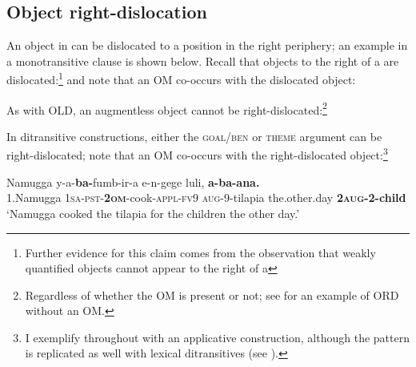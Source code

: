 \documentclass[output=paper,newtxmath,modfonts,nonflat,hidelinks]{langsci/langscibook}
\begin{document}
\subsection{Object right-dislocation}
\label{sec:ranero:3.3}

An object in  can be dislocated to a position in the right periphery; an example in a monotransitive clause is shown below. Recall that objects to the right of a  are dislocated:\footnote{Further evidence for this claim comes from the observation that weakly quantified objects cannot appear to the right of a 

\zlast
} and note that an OM co-occurs with the dislocated object: 

 
\z

As with OLD, an augmentless object cannot be right-dislocated:\footnote{Regardless of whether the OM is present or not; see  for an example of ORD without an OM.}

\z

In ditransitive constructions, either the \textsc{goal/ben} or \textsc{theme} argument can be right-dislocated; note that an OM co-occurs with the right-dislocated object:\footnote{I exemplify throughout with an applicative construction, although the pattern is replicated as well with lexical ditransitives (see \citealt{ranero2015}).}

\ea    \label{ex:ranero:23}
\gll Namugga    y-a-\textbf{ba-}fumb-ir-a                     e-n-gege         luli,            \textbf{a-ba-ana.}\\
1.Namugga \textsc{1sa-pst-}\textbf{\textsc{2om}}{}-cook-\textsc{appl-fv}9 \textsc{aug}{}-9-tilapia the.other.day \textbf{2\textsc{aug}}\textbf{{}-2-child}\\
\glt ‘Namugga cooked the tilapia for the children the other day.’
\z
\end{document}
